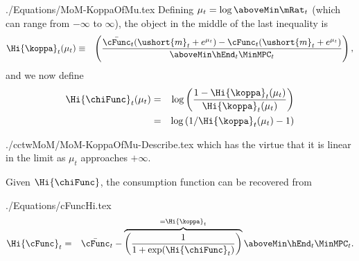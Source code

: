 \documentclass[titlepage]{\econtex}
\begin{document}
\begin{verbatimwrite}{./Equations/MoM-KoppaOfMu.tex}
Defining $\mu_{t} =
\log \aboveMin \mRat_{t}$ (which can range from $-\infty$ to $\infty$), the object in the middle of the last inequality is
\begin{eqnarray}
\Hi{\koppa}_{t}(\mu_{t})  & \equiv & \left(\frac{\bar{\cFunc}_{t}(\ushort{m}_{t}+e^{\mu_{t}})-\cFunc_{t}(\ushort{m}_{t}+e^{\mu_{t}})}{\aboveMin \hEnd_{t} \MinMPC_{t}}\right), \label{eq:koppa}
\end{eqnarray}
and we now define
\begin{eqnarray}
  \Hi{\chiFunc}_{t}(\mu_{t}) & = & \log \left(\frac{1-\Hi{\koppa}_{t}(\mu_{t})}{\Hi{\koppa}_{t}(\mu_{t})}\right)
\\ & = & \log \left(1/\Hi{\koppa}_{t}(\mu_{t})-1\right) \label{eq:chi}
\end{eqnarray}
\end{verbatimwrite}

\begin{verbatimwrite}{./cctwMoM/MoM-KoppaOfMu-Describe.tex}
which has the virtue that it is linear in the limit as $\mu_{t}$ approaches $+\infty$.

Given $\Hi{\chiFunc}$, the consumption function can be recovered from
\end{verbatimwrite}

\begin{verbatimwrite}{./Equations/cFuncHi.tex}
\begin{eqnarray}
  \Hi{\cFunc}_{t} & = & \bar{\cFunc}_{t}-\overbrace{\left(\frac{1}{1+\exp(\Hi{\chiFunc}_{t})}\right)}^{=\Hi{\koppa}_{t}} \aboveMin \hEnd_{t} \MinMPC_{t}. \label{eq:cFuncHi}
\end{eqnarray}
\end{verbatimwrite}

\end{document}
